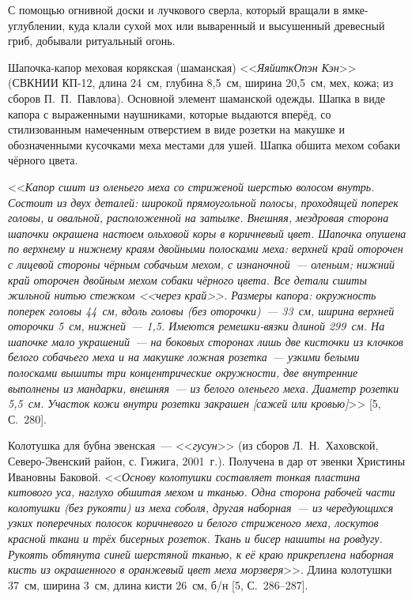 С помощью огнивной доски и лучкового сверла, который вращали в ямке-углублении, куда клали сухой мох или вываренный и высушенный древесный гриб, добывали ритуальный огонь.

Шапочка-капор меховая корякская (шаманская) <<\textit{ЯяйиткОпэн Кэн}>> (СВКНИИ КП-12, длина 24~см, глубина 8,5~см, ширина 20,5~см, мех, кожа; из сборов П.~П.~Павлова). Основной элемент шаманской одежды. Шапка в виде капора с выраженными наушниками, которые выдаются вперёд, со стилизованным намеченным отверстием в виде розетки на макушке и обозначенными кусочками меха местами для ушей. Шапка обшита мехом собаки чёрного цвета.

<<\textit{Капор сшит из оленьего меха со стриженой шерстью волосом внутрь. Состоит из двух деталей: широкой прямоугольной полосы, проходящей поперек головы, и овальной, расположенной на затылке. Внешняя, мездровая сторона шапочки окрашена настоем ольховой коры в коричневый цвет. Шапочка опушена по верхнему и нижнему краям двойными полосками меха: верхней край оторочен с лицевой стороны чёрным собачьим мехом, с изнаночной~--- оленьим; нижний край оторочен двойным мехом собаки чёрного цвета. Все детали сшиты жильной нитью стежком <<\textit{через край}>>. Размеры капора: окружность поперек головы 44~см, вдоль головы (без оторочки)~--- 33~см, ширина верхней оторочки 5~см, нижней~--- 1,5. Имеются ремешки-вязки длиной 299~см. На шапочке мало украшений~--- на боковых сторонах лишь две кисточки из клочков белого собачьего меха и на макушке ложная розетка~--- узкими белыми полосками вышиты три концентрические окружности, две внутренние выполнены из мандарки, внешняя~--- из белого оленьего меха. Диаметр розетки 5,5~см. Участок кожи внутри розетки закрашен [сажей или кровью]}>> [5, С.~280].

Колотушка для бубна эвенская~--- <<\textit{гусун}>> (из сборов Л.~Н.~Хаховской, Северо-Эвенский район, с. Гижига, 2001~г.). Получена в дар от эвенки Христины Ивановны Баковой. <<\textit{Основу колотушки составляет тонкая пластина китового уса, наглухо обшитая мехом и тканью. Одна сторона рабочей части колотушки (без рукояти) из меха соболя, другая наборная~--- из чередующихся узких поперечных полосок коричневого и белого стриженого меха, лоскутов красной ткани и трёх бисерных розеток. Ткань и бисер нашиты на ровдугу. Рукоять обтянута синей шерстяной тканью, к её краю прикреплена наборная кисть из окрашенного в оранжевый цвет меха морзверя}>>. Длина колотушки 37~см, ширина 3~см, длина кисти 26~см, б/н [5, С.~286--287].

